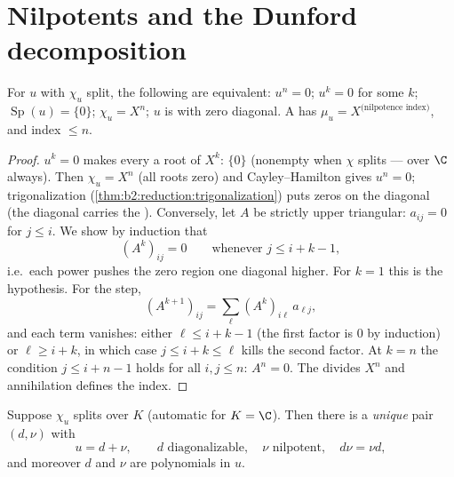 \section{Nilpotents and the Dunford decomposition}

\begin{proposition}\label{prop:b2:reduction:nilpotent}
For $u$ with $\chi_u$ split, the following are equivalent: $u^n =
0$; $u^k = 0$ for some $k$; $\operatorname{Sp}(u) = \{0\}$; $\chi_u
= X^n$; $u$ is  with zero diagonal. A  has $\mu_u = X^{\text{(nilpotence index)}}$, and index
$\leq n$.
\end{proposition}

\begin{proof}
$u^k = 0$ makes every  a root of $X^k$:  $\{0\}$
(nonempty when $\chi$ splits --- over $\C$ always). Then $\chi_u =
X^n$ (all roots zero) and Cayley--Hamilton gives $u^n = 0$;
trigonalization (\cref{thm:b2:reduction:trigonalization}) puts
zeros on the diagonal (the diagonal carries the ).
Conversely, let $A$ be strictly upper triangular: $a_{ij} = 0$
for $j \leq i$. We show by induction that
\[
(A^k)_{ij} = 0 \qquad \text{whenever } j \leq i + k - 1,
\]
i.e.\ each power pushes the zero region one diagonal higher. For
$k = 1$ this is the hypothesis. For the step,
\[
(A^{k+1})_{ij} = \sum_{\ell} (A^k)_{i\ell}\,a_{\ell j} ,
\]
and each term vanishes: either $\ell \leq i + k - 1$ (the first
factor is $0$ by induction) or $\ell \geq i + k$, in which case
$j \leq i + k \leq \ell$ kills the second factor. At $k = n$ the
condition $j \leq i + n - 1$ holds for all $i, j \leq n$: $A^n =
0$. The  divides $X^n$ and annihilation
defines the index.
\end{proof}

\begin{theorem}\label{thm:b2:reduction:dunford}
Suppose $\chi_u$ splits over $K$ (automatic for $K = \C$). Then
there is a \emph{unique} pair $(d, \nu)$ with
\[
u = d + \nu, \qquad d \text{ diagonalizable}, \quad \nu
\text{ nilpotent}, \quad d\nu = \nu d ,
\]
and moreover $d$ and $\nu$ are polynomials in
$u$.
\end{theorem}

